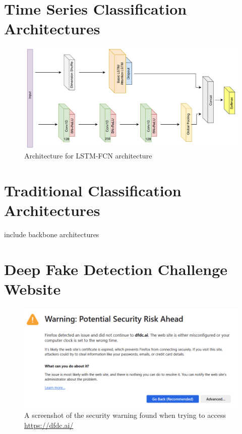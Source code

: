 \chapter{Time Series Classification Architectures}
\label{ch:series-architectures}

\begin{figure}[h]
    \centering
    \includegraphics[width=0.75\linewidth]{dissertation//figures/lstm-fcn.png}
    \caption{Architecture for LSTM-FCN architecture\cite{karim2017lstm}}
    \label{fig:lstm-fcn}
\end{figure}

\chapter{Traditional Classification Architectures}
\label{ch:trad-architectures}

{\huge include backbone architectures}

\chapter{Deep Fake Detection Challenge Website}
\label{ch:dfdcai}

\begin{figure}[h]
    \centering
    \includegraphics[width=1\linewidth]{dissertation//figures/dfdc.png}
    \caption{A screenshot of the security warning found when trying to access \url{https://dfdc.ai/}}
    \label{fig:dfdcai}
\end{figure}

